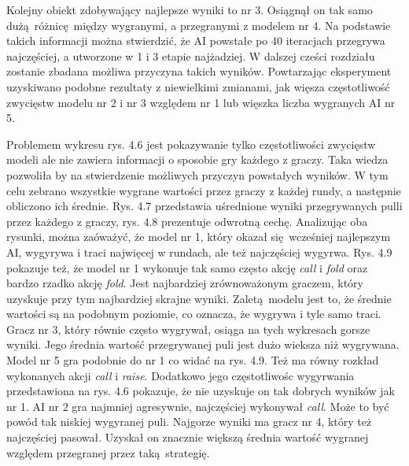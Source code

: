 \documentclass[12pt,oneside,a4paper]{report}
\begin{document}
Kolejny obiekt zdobywający najlepsze wyniki
to nr 3. Osiągnął on tak samo dużą różnicę między wygranymi, a przegranymi z modelem nr 4.
Na podstawie takich informacji można stwierdzić, że AI powstałe po 40 iteracjach przegrywa
najczęściej,
a
utworzone w 1 i 3 etapie najżadziej. W
dalszej cześci rozdziału zostanie zbadana możliwa przyczyna takich wyników.
Powtarzając eksperyment uzyskiwano podobne rezultaty z niewielkimi zmianami, jak więsza
częstotliwość zwycięstw modelu nr 2 i nr 3 względem nr 1 lub więszka liczba wygranych AI nr 5. 

Problemem wykresu rys. 4.6 jest pokazywanie tylko częstotliwości zwycięstw modeli ale nie zawiera
informacji o sposobie gry każdego z graczy. 
Taka wiedza pozwoliła by na stwierdzenie możliwych przyczyn powstałych
wyników.
W tym celu zebrano wszystkie wygrane wartości przez graczy z każdej rundy, a następnie
obliczono ich średnie. Rys. 4.7 przedstawia uśrednione wyniki przegrywanych pulli przez każdego z
graczy, rys. 4.8 prezentuje odwrotną cechę. Analizując oba rysunki, można zaóważyć, że model
nr 1, który okazał się wcześniej najlepszym AI, wygyrywa i traci najwięcej w rundach, ale też 
najczęściej wygyrwa. Rys. 4.9 pokazuje też, że model nr 1 wykonuje tak samo często akcję \emph{call}
i \emph{fold} oraz bardzo rzadko akcję \emph{fold}. Jest
najbardziej zrównoważonym graczem, który uzyskuje przy tym najbardziej skrajne wyniki. Zaletą modelu jest to, że 
średnie wartości są na podobnym poziomie, co oznacza, że wygrywa i tyle samo traci.
Gracz nr 3, który równie często wygrywał, 
osiąga na tych wykresach gorsze wyniki. Jego średnia wartość przegrywanej puli jest dużo wieksza
niż
wygrywana.  Model nr 5 gra podobnie do nr 1 co widać na rys. 4.9. Też ma równy rozkład wykonanych 
akcji \emph{call} i \emph{raise}.
Dodatkowo jego częstotliwośc wygyrwania przedstawiona na rys. 4.6 pokazuje, że nie uzyskuje on
tak dobrych wyników jak nr 1. AI nr 2 gra najmniej agresywnie, najczęściej wykonywał \emph{call}.
Może to być powód tak niskiej wygyranej puli.
Najgorze wyniki ma gracz nr 4, który też najczęściej pasował. Uzyskał
on znacznie większą średnia wartość wygranej względem przegranej przez taką strategię.


\vspace{1cm}
\end{document}
